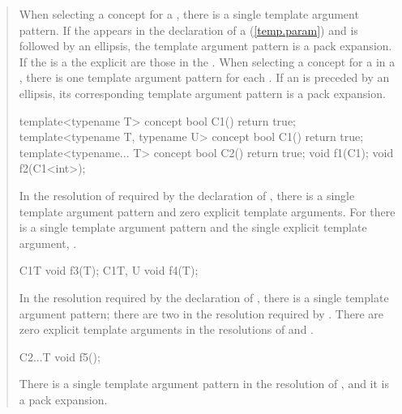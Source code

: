 \begin{quote}
\pnum
When selecting a concept for a ,
there is a single template argument pattern. 
% 
If the  appears in the declaration 
of a  (\ref{temp.param}) and is
followed by an ellipsis, the template argument pattern is a pack
expansion.
% 
If the 
is a  the explicit
 are those in
the .
% 
When selecting a concept for a  in a 
, there is one template argument pattern 
for each .
% 
If an  is
preceded by an ellipsis, its corresponding template argument pattern
is a pack expansion.
% 
\enterexample
\begin{codeblock}
template<typename T> concept bool C1() { return true; }
template<typename T, typename U> concept bool C1() { return true; }
template<typename... T> concept bool C2() { return true; }
% 
void f1(C1); 
void f2(C1<int>);
\end{codeblock}
% 
In the resolution of  required by the declaration of , 
there is a single template argument pattern and zero explicit template 
arguments.
% 
For  there is a single template argument pattern and the 
single explicit template argument, .
\begin{codeblock}
C1{T} void f3(T);
C1{T, U} void f4(T);
\end{codeblock}
In the resolution required by the declaration of , there
is a single template argument pattern; there are two in the resolution
required by . There are zero explicit template arguments
in the resolutions of  and .
\begin{codeblock}
C2{...T} void f5();
\end{codeblock}
There is a single template argument pattern in the resolution of
, and it is a pack expansion.
\exitexample


\end{quote}
